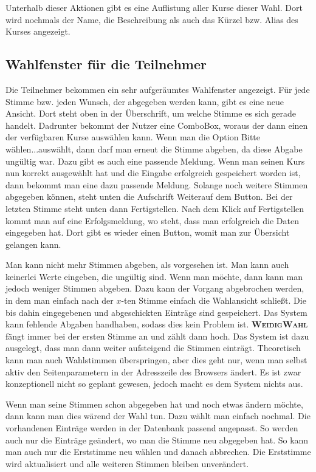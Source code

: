 \documentclass[ngerman]{ltxdoc}
\newcommand{\name}{\textbf{\textsc{WeidigWahl}}\xspace}
\begin{document}
Unterhalb dieser Aktionen gibt es eine Auflistung aller Kurse dieser Wahl. Dort
wird nochmals der Name, die Beschreibung als auch das Kürzel bzw. Alias des Kurses
angezeigt.

\subsection{Wahlfenster für die Teilnehmer}

Die Teilnehmer bekommen ein sehr aufgeräumtes Wahlfenster angezeigt. Für jede
Stimme bzw. jeden Wunsch, der abgegeben werden kann, gibt es eine neue Ansicht.
Dort steht oben in der Überschrift, um welche Stimme es sich gerade handelt.
Dadrunter bekommt der Nutzer eine ComboBox, woraus der dann einen der verfügbaren
Kurse auswählen kann. Wenn man die Option \glqq Bitte wählen...\grqq auswählt,
dann darf man erneut die Stimme abgeben, da diese Abgabe ungültig war. Dazu
gibt es auch eine passende Meldung. Wenn man seinen Kurs nun korrekt ausgewählt
hat und die Eingabe erfolgreich gespeichert worden ist, dann bekommt man eine
dazu passende Meldung. Solange noch weitere Stimmen abgegeben können, steht unten
die Aufschrift \glqq Weiter\grqq auf dem Button. Bei der letzten Stimme steht
unten dann \glqq Fertigstellen\grqq. Nach dem Klick auf Fertigstellen kommt man
auf eine Erfolgsmeldung, wo steht, dass man erfolgreich die Daten eingegeben hat.
Dort gibt es wieder einen Button, womit man zur Übersicht gelangen kann.

Man kann nicht mehr Stimmen abgeben, als vorgesehen ist. Man kann auch keinerlei
Werte eingeben, die ungültig sind. Wenn man möchte, dann kann man jedoch weniger
Stimmen abgeben. Dazu kann der Vorgang abgebrochen werden, in dem man einfach
nach der $x$-ten Stimme einfach die Wahlansicht schließt. Die bis dahin eingegebenen
und abgeschickten Einträge sind gespeichert. Das System kann fehlende Abgaben
handhaben, sodass dies kein Problem ist. \name fängt immer bei der ersten Stimme
an und zählt dann hoch. Das System ist dazu ausgelegt, dass man dann weiter
aufsteigend die Stimmen einträgt. Theoretisch kann man auch Wahlstimmen überspringen,
aber dies geht nur, wenn man selbst aktiv den Seitenparametern in der Adresszeile
des Browsers ändert. Es ist zwar konzeptionell nicht so geplant gewesen, jedoch
macht es dem System nichts aus.

Wenn man seine Stimmen schon abgegeben hat und noch etwas ändern möchte, dann kann
man dies wärend der Wahl tun. Dazu wählt man einfach nochmal. Die vorhandenen
Einträge werden in der Datenbank passend angepasst. So werden auch nur die Einträge
geändert, wo man die Stimme neu abgegeben hat. So kann man auch nur die Erststimme
neu wählen und danach abbrechen. Die Erststimme wird aktualisiert und alle weiteren
Stimmen bleiben unverändert.
\end{document}
